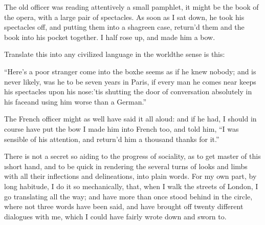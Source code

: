 \documentclass[twoside]{article}
\begin{document}
The old officer was reading attentively a small pamphlet, it might be the
book of the opera, with a large pair of spectacles.  As soon as I sat
down, he took his spectacles off, and putting them into a shagreen case,
return’d them and the book into his pocket together.  I half rose up, and
made him a bow.

Translate this into any civilized language in the world\tsk the sense is
this:

“Here’s a poor stranger come into the box\tsk he seems as if he knew nobody;
and is never likely, was he to be seven years in Paris, if every man he
comes near keeps his spectacles upon his nose:\tsk ’tis shutting the door of
conversation absolutely in his face\tsk and using him worse than a German.”

The French officer might as well have said it all aloud: and if he had, I
should in course have put the bow I made him into French too, and told
him, “I was sensible of his attention, and return’d him a thousand thanks
for it.”

There is not a secret so aiding to the progress of sociality, as to get
master of this \i{short hand}, and to be quick in rendering the several
turns of looks and limbs with all their inflections and delineations,
into plain words.  For my own part, by long habitude, I do it so
mechanically, that, when I walk the streets of London, I go translating
all the way; and have more than once stood behind in the circle, where
not three words have been said, and have brought off twenty different
dialogues with me, which I could have fairly wrote down and sworn to.
\end{document}
